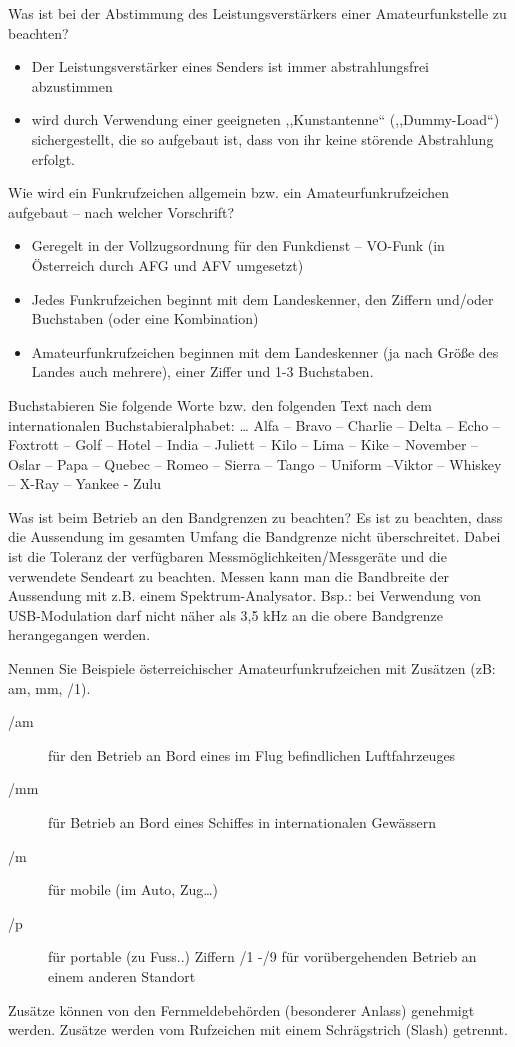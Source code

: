 \documentclass[avery5371,grid,frame,a4paper]{flashcards}
\newcommand{\card}[3]{
  \begin{flashcard}[{\chap} -- #1]{#2}#3\end{flashcard}
}
\begin{document}
\card{49}{Was ist bei der Abstimmung des Leistungsverstärkers einer Amateurfunkstelle zu beachten?}{
  \begin{itemize}
    \item Der Leistungsverstärker eines Senders ist immer abstrahlungsfrei abzustimmen
    \item wird durch Verwendung einer geeigneten ,,Kunstantenne`` (,,Dummy-Load``) sichergestellt, die so aufgebaut ist, dass von ihr keine störende Abstrahlung erfolgt.
  \end{itemize}
}
\card{50}{Wie wird ein Funkrufzeichen allgemein bzw. ein Amateurfunkrufzeichen aufgebaut – nach welcher Vorschrift?}{
  \begin{itemize}
    \item Geregelt in der Vollzugsordnung für den Funkdienst – VO-Funk (in Österreich durch AFG und AFV umgesetzt)
    \item Jedes Funkrufzeichen beginnt mit dem Landeskenner, den Ziffern und/oder Buchstaben (oder eine Kombination)
    \item Amateurfunkrufzeichen beginnen mit dem Landeskenner (ja nach Größe des Landes auch mehrere), einer Ziffer und 1-3 Buchstaben.
  \end{itemize}
}
\card{51}{Buchstabieren Sie folgende Worte bzw. den folgenden Text nach dem internationalen Buchstabieralphabet: \dots}{
  Alfa – Bravo – Charlie – Delta – Echo – Foxtrott – Golf – Hotel – India – Juliett – Kilo – Lima – Kike – November – Oslar – Papa – Quebec – Romeo – Sierra – Tango – Uniform –Viktor – Whiskey – X-Ray – Yankee - Zulu
}
\card{52}{Was ist beim Betrieb an den Bandgrenzen zu beachten?}{
  Es ist zu beachten, dass die Aussendung im gesamten Umfang die Bandgrenze nicht überschreitet. Dabei ist die Toleranz der verfügbaren Messmöglichkeiten/Messgeräte und die verwendete Sendeart zu beachten. Messen kann man die Bandbreite der Aussendung mit z.B. einem Spektrum-Analysator.
  Bsp.: bei Verwendung von USB-Modulation darf nicht näher als 3,5 kHz an die obere Bandgrenze herangegangen werden.
}
\card{53}{Nennen Sie Beispiele österreichischer Amateurfunkrufzeichen mit Zusätzen (zB: am, mm, /1).}{
  \footnotesize
  \begin{description}
    \item[/am] für den Betrieb an Bord eines im Flug befindlichen Luftfahrzeuges
    \item[/mm] für Betrieb an Bord eines Schiffes in internationalen Gewässern
    \item[/m] für mobile (im Auto, Zug…)
    \item[/p] für portable (zu Fuss..)  Ziffern /1 -/9 für vorübergehenden Betrieb an einem anderen Standort
  \end{description}
  Zusätze können von den Fernmeldebehörden (besonderer Anlass) genehmigt werden.
  Zusätze werden vom Rufzeichen mit einem Schrägstrich (Slash) getrennt.
}
\end{document}

